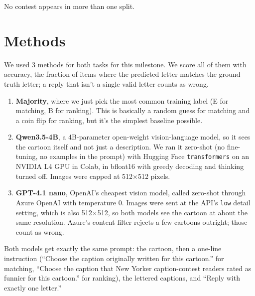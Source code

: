 \documentclass[11pt]{article}
\newcommand{\cq}[1]{``#1''}
\begin{document}
No contest appears in more than one split.

\section{Methods}
We used 3 methods for both tasks for this milestone. We score all of them with accuracy, the fraction of items where the predicted letter matches the ground truth letter; a reply that isn't a single valid letter counts as wrong.
\begin{enumerate}
  \item \textbf{Majority}, where we just pick the most common training label (E for matching, B for ranking). This is basically a random guess for matching and a coin flip for ranking, but it's the simplest baseline possible.
  \item \textbf{Qwen3.5-4B}, a 4B-parameter open-weight vision-language model, so it sees the cartoon itself and not just a description. We ran it zero-shot (no fine-tuning, no examples in the prompt) with Hugging Face \texttt{transformers} on an NVIDIA L4 GPU in Colab, in bfloat16 with greedy decoding and thinking turned off. Images were capped at 512$\times$512 pixels.
  \item \textbf{GPT-4.1 nano}, OpenAI's cheapest vision model, called zero-shot through Azure OpenAI with temperature 0. Images were sent at the API's \texttt{low} detail setting, which is also 512$\times$512, so both models see the cartoon at about the same resolution. Azure's content filter rejects a few cartoons outright; those count as wrong.
\end{enumerate}
Both models get exactly the same prompt: the cartoon, then a one-line instruction (\cq{Choose the caption originally written for this cartoon.} for matching, \cq{Choose the caption that New Yorker caption-contest readers rated as funnier for this cartoon.} for ranking), the lettered captions, and \cq{Reply with exactly one letter.}
\end{document}
